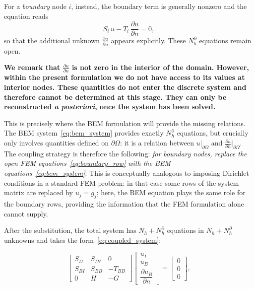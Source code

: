 \documentclass[11pt,onecolumn]{article}
\begin{document}
{For a \textit{boundary} node $i$, instead, the boundary term is generally nonzero and the equation reads
\begin{equation}
S_i\, u - T_i\, \frac{\partial u}{\partial n} = 0,
\label{eq:boundary_row}
\end{equation}
so that the additional unknown $\frac{\partial u}{\partial n}$ appears explicitly. These $N_h^{\partial}$ equations remain open.

\textbf{We remark that $\frac{\partial u}{\partial n}$ is not zero in the interior of the domain. However, within the present formulation we do not have access to its values at interior nodes. These quantities do not enter the discrete system and therefore cannot be determined at this stage. They can only be reconstructed \textit{a posteriori}, once the system has been solved.}
} 
This is precisely where the BEM formulation will provide the missing relations.
The BEM system~\eqref{eq:bem_system} provides exactly $N_h^\partial$ equations, but crucially only involves quantities defined on $\partial\Omega$: it is a relation between $u|_{\partial\Omega}$ and $\frac{\partial u}{\partial n}|_{\partial\Omega}$. The coupling strategy is therefore the following: \textit{for boundary nodes, replace the open FEM equations~\eqref{eq:boundary_row} with the BEM equations~\eqref{eq:bem_system}}. This is conceptually analogous to imposing Dirichlet conditions in a standard FEM problem: in that case some rows of the system matrix are replaced by $u_j = g_j$; here, the BEM equation plays the same role for the boundary rows, providing the information that the FEM formulation alone cannot supply.

After the substitution, the total system has $N_h + N_h^\partial$ equations in $N_h + N_h^\partial$ unknowns and takes the form~\eqref{eq:coupled_system}:

\begin{equation}
\begin{bmatrix}
S_{II} & S_{IB} & 0 \\
S_{BI} & S_{BB} & -T_{BB} \\
0 & H & -G
\end{bmatrix}
\begin{bmatrix}
u_I \\ u_B \\ \dfrac{\partial u_B}{\partial n}
\end{bmatrix}
=
\begin{bmatrix}
0 \\ 0 \\ 0
\end{bmatrix},
\label{eq:coupled_system}
\end{equation}
\end{document}
